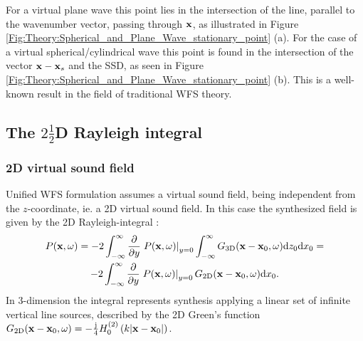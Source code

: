 For a virtual plane wave this point lies in the intersection of the line, parallel to the wavenumber vector, passing through $\mathbf{x}$, as illustrated in Figure  \ref{Fig:Theory:Spherical_and_Plane_Wave_stationary_point} (a).
For the case of a virtual spherical/cylindrical wave this point is found in the intersection of the vector $ \mathbf{x} - \mathbf{x}_s $ and the SSD, as seen in Figure \ref{Fig:Theory:Spherical_and_Plane_Wave_stationary_point} (b). This is a well-known result in the field of traditional WFS theory.

\subsection{The $2\frac{1}{2}$D Rayleigh integral}
\subsubsection{2D virtual sound field}

Unified WFS formulation assumes a virtual sound field, being independent from the $z$-coordinate, ie. a 2D virtual sound field. In this case the synthesized field is given by the 2D Rayleigh-integral \cite{Spors2008:WFSrevisited}:
\begin{multline}
P(\mathbf{x},\omega) = -2 \int_{-\infty}^{\infty} \frac{\partial}{\partial y} \left. P(\mathbf{x},\omega) \right|_{y = 0} 
\int_{-\infty}^{\infty} G_{3\mathrm{D}}(\mathbf{x} - \mathbf{x}_0,\omega) \mathrm{d} z_0 \mathrm{d} x_0 = \\
-2 \int_{-\infty}^{\infty} \frac{\partial}{\partial y} \left. P(\mathbf{x},\omega) \right|_{y = 0} G_{2\mathrm{D}}(\mathbf{x} - \mathbf{x}_0,\omega) \mathrm{d} x_0.
\label{Eq:2D_Rayleigh}
\end{multline}
In 3-dimension the integral represents synthesis applying a linear set of infinite vertical line sources, described by the 2D Green's function $G_{2\mathrm{D}}(\mathbf{x} - \mathbf{x}_0,\omega) = -\frac{\mathrm{j}}{4} H_0^{(2)}\left( k |\mathbf{x}-\mathbf{x}_0| \right)$.

